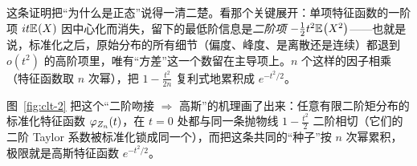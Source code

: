 这条证明把``为什么是正态''说得一清二楚。看那个关键展开：单项特征函数的一阶项 $it\mathbb{E}_{}\!\left(X\right)$ 因中心化而消失，留下的最低阶信息是\emph{二阶项} $-\tfrac12 t^2\mathbb{E}_{}\!\left(X^2\right)$——也就是说，标准化之后，原始分布的所有细节（偏度、峰度、是离散还是连续）都退到 $o(t^2)$ 的高阶项里，唯有``方差''这一个数留在主导项上。$n$ 个这样的因子相乘（特征函数取 $n$ 次幂），把 $1-\tfrac{t^2}{2n}$ 复利式地累积成 $e^{-t^2/2}$。


图~\ref{fig:clt-2} 把这个``二阶吻接 $\Rightarrow$ 高斯''的机理画了出来：任意有限二阶矩分布的标准化特征函数 $\varphi_{Z_n}(t)$，在 $t=0$ 处都与同一条抛物线 $1-\tfrac{t^2}{2}$ 二阶相切（它们的二阶 Taylor 系数被标准化锁成同一个），而把这条共同的``种子''按 $n$ 次幂累积，极限就是高斯特征函数 $e^{-t^2/2}$。

